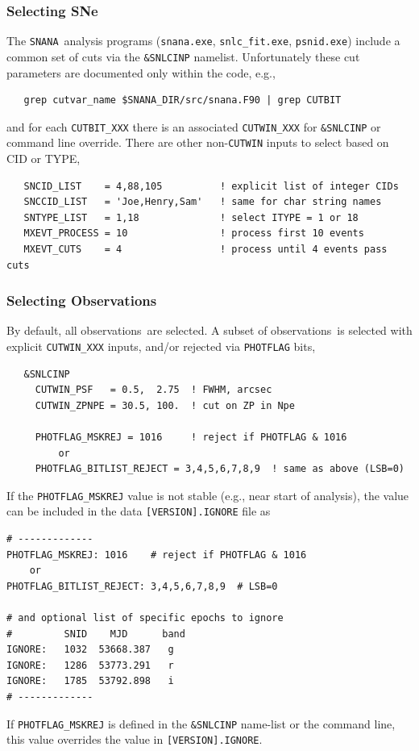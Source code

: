 \documentclass[12pt]{article}
\newcommand{\snana}{{\tt SNANA}}
\newcommand{\obss}{observations}
\begin{document}
  \clearpage
  \subsubsection{Selecting SNe}
  \label{sss:select_SN}

The \snana\ analysis programs 
({\tt snana.exe}, {\tt snlc\_fit.exe}, {\tt psnid.exe})
include a common set of cuts via the {\tt \&SNLCINP} namelist.
Unfortunately these cut parameters are documented only within
the code, e.g.,
\begin{verbatim}                                                               
   grep cutvar_name $SNANA_DIR/src/snana.F90 | grep CUTBIT
\end{verbatim}
and for each {\tt CUTBIT\_XXX} there is an associated 
{\tt CUTWIN\_XXX} for {\tt \&SNLCINP} or command line override.
There are other non-{\tt CUTWIN} inputs to select based on CID or TYPE,
\begin{verbatim}
   SNCID_LIST    = 4,88,105          ! explicit list of integer CIDs
   SNCCID_LIST   = 'Joe,Henry,Sam'   ! same for char string names
   SNTYPE_LIST   = 1,18              ! select ITYPE = 1 or 18
   MXEVT_PROCESS = 10                ! process first 10 events
   MXEVT_CUTS    = 4                 ! process until 4 events pass cuts
\end{verbatim}


  \subsubsection{Selecting Observations}
  \label{sss:select_obs}

By default, all \obss\ are selected.
A subset of \obss\ is selected with explicit {\tt CUTWIN\_XXX} inputs,
and/or rejected via {\tt PHOTFLAG} bits,
\begin{verbatim} 
   &SNLCINP
     CUTWIN_PSF   = 0.5,  2.75  ! FWHM, arcsec
     CUTWIN_ZPNPE = 30.5, 100.  ! cut on ZP in Npe

     PHOTFLAG_MSKREJ = 1016     ! reject if PHOTFLAG & 1016
         or
     PHOTFLAG_BITLIST_REJECT = 3,4,5,6,7,8,9  ! same as above (LSB=0)
\end{verbatim}
%
If the {\tt PHOTFLAG\_MSKREJ} value is not stable 
(e.g., near start of analysis), the value can be included
in the data {\tt [VERSION].IGNORE} file as
%
\begin{verbatim}
# -------------
PHOTFLAG_MSKREJ: 1016    # reject if PHOTFLAG & 1016
    or
PHOTFLAG_BITLIST_REJECT: 3,4,5,6,7,8,9  # LSB=0

# and optional list of specific epochs to ignore
#         SNID    MJD      band
IGNORE:   1032  53668.387   g 
IGNORE:   1286  53773.291   r
IGNORE:   1785  53792.898   i
# -------------
\end{verbatim}
%
If {\tt PHOTFLAG\_MSKREJ} is defined in the {\tt \&SNLCINP} name-list
or the command line, this value overrides the value in {\tt [VERSION].IGNORE}.
\end{document}

